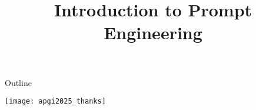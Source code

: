 \documentclass[xcolor=dvipsnames,compress,t,pdf,9pt]{beamer}
\title[\insertframenumber /\inserttotalframenumber]{Introduction to Prompt Engineering}
\begin{document}
	
	\begin{frame}[plain]
		\begin{center}
		\end{center}
	\end{frame}
		
	\begin{frame}{Outline}
	    \tableofcontents
	\end{frame}

	
%	

	\begin{frame}[plain]
		\begin{center}
		\texttt{[image: apgi2025\_thanks]}
		\end{center}
	\end{frame}
	
\end{document}
